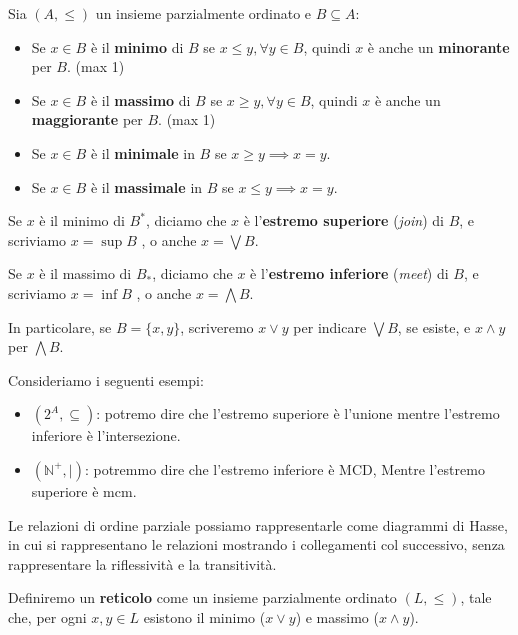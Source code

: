 \begin{definizione}
    Sia $(A,\leq)$ un insieme parzialmente ordinato e $B \subseteq A$:
    \begin{itemize}
        \item Se $x \in B$ è il \textbf{minimo} di $B$ se $x \leq y, \forall y
                  \in B$, quindi $x$ è anche un \textbf{minorante} per $B$. (max 1)
        \item Se $x \in B$ è il \textbf{massimo} di $B$ se $x \geq y,\forall y
                  \in B$, quindi $x$ è anche un \textbf{maggiorante} per $B$. (max 1)
        \item Se $x \in B$ è il \textbf{minimale} in $B$ se $x \geq y \implies
                  x = y$.
        \item Se $x \in B$ è il \textbf{massimale} in $B$ se $x \leq y \implies
                  x = y$.
    \end{itemize}
\end{definizione}
\begin{definizione}
    Se $x$ è il minimo di $B^\ast$, diciamo che $x$ è l'\textbf{estremo superiore}
    (\textit{join}) di $B$, e scriviamo $x = \sup B$ , o anche $x = \bigvee B$.

    Se $x$ è il massimo di $B_\ast$, diciamo che $x$ è l'\textbf{estremo inferiore}
    (\textit{meet}) di $B$, e scriviamo $x = \inf B$ , o anche $x = \bigwedge B$.

    In particolare, se $B = \{x, y\}$, scriveremo $x \lor y$ per indicare $\bigvee
        B$, se esiste, e $x \land y$ per $\bigwedge B$.
\end{definizione}
\begin{esempio}
    Consideriamo i seguenti esempi:
    \begin{itemize}
        \item $(2^A, \subseteq)$: potremo dire che l'estremo superiore è l'unione
              mentre l'estremo inferiore è l'intersezione.
        \item $(\mathbb{N}^+,|)$: potremmo dire che l'estremo inferiore è MCD, Mentre
              l'estremo superiore è mcm.
    \end{itemize}
\end{esempio}
Le relazioni di ordine parziale possiamo rappresentarle come diagrammi di Hasse,
in cui si rappresentano le relazioni mostrando i collegamenti col successivo, 
senza rappresentare la riflessività e la transitività.
\begin{definizione}
    Definiremo un \textbf{reticolo} come un insieme parzialmente ordinato $(L,
        \leq)$, tale che, per ogni $x,y\in L$ esistono il minimo ($x \lor y$) e
    massimo ($x \land y$).
\end{definizione}
